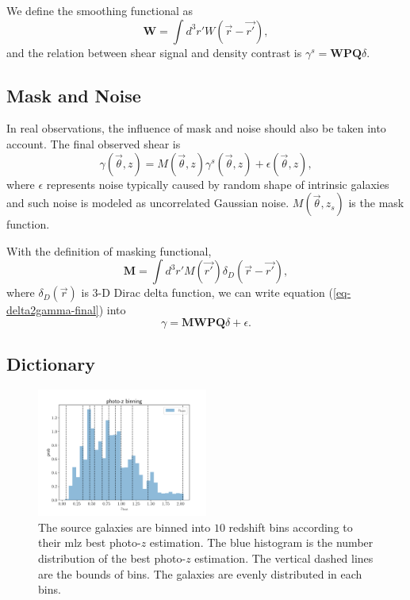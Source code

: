 \documentclass[twocolumn]{aastex62}
\begin{document}
We define the smoothing functional as
\begin{equation}
\mathbf{W} = \int d^3 r' W(\vec{r}-\vec{r'}),
\end{equation}
and the relation between shear signal and density contrast is $\gamma^s=\mathbf{W} \mathbf{P} \mathbf{Q} \delta$.

\subsection{Mask and Noise}
\label{subsec:method-msknoise}

In real observations, the influence of mask and noise should also be taken into account. The final observed shear is
\begin{equation}\label{eq-delta2gamma-final}
\gamma(\vec{\theta},z)=M(\vec{\theta},z) \gamma^s(\vec{\theta},z) + \epsilon(\vec{\theta},z),
\end{equation}
where $\epsilon$ represents noise typically caused by random shape of intrinsic galaxies and such noise is modeled 
as uncorrelated Gaussian noise. $M(\vec{\theta},z_s)$ is the mask function.

With the definition of masking functional,
\begin{equation}
\mathbf{M}= \int d^3 r' M(\vec{r'}) \delta_D(\vec{r}-\vec{r'}),
\end{equation}
where $\delta_D(\vec{r})$ is $3$-D Dirac delta function, we can write equation (\ref{eq-delta2gamma-final}) into
\begin{equation}\label{eq-delta2gamma-operator-final}
\gamma =\mathbf{M} \mathbf{W} \mathbf{P} \mathbf{Q} \delta + \epsilon.
\end{equation}

\subsection{Dictionary}
\label{subsec:method-dictionary}
\begin{figure}
 \centering
 \includegraphics[width=0.5\textwidth]{photo-z_binning.pdf}
 \caption{The source galaxies are binned into $10$ redshift bins according to their mlz best photo-$z$ estimation. 
        The blue histogram is the number distribution of the best photo-$z$ estimation. The vertical dashed lines 
        are the bounds of bins. The galaxies are evenly distributed in each bins.}
\end{figure}
\end{document}
